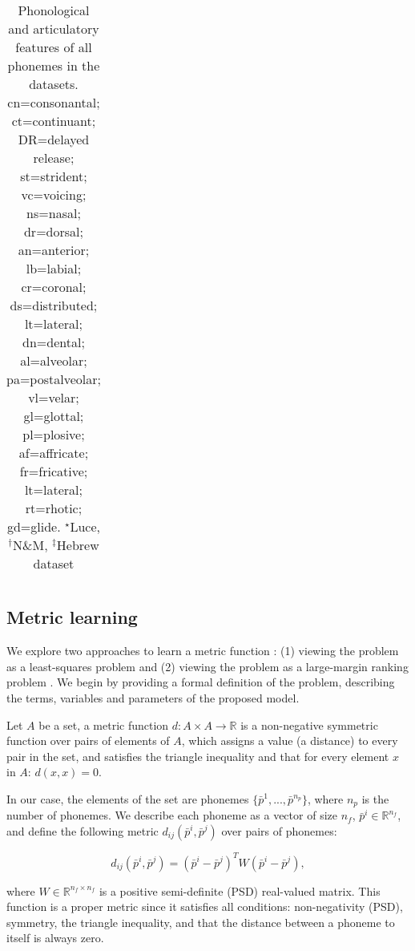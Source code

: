 \begin{landscape}
\begin{table}[H]
\begin{tabular}{|c|c|c|c|c|c|c|c|c|c|c|c|c||c|c|c|c|c|c|c|c|c|c|c|c|c|c|}
\hline

\end{tabular}

\caption{Phonological and articulatory features of all phonemes in the datasets. cn=consonantal; ct=continuant; DR=delayed release; st=strident; vc=voicing; ns=nasal; dr=dorsal; an=anterior; lb=labial; cr=coronal; ds=distributed; lt=lateral; dn=dental; al=alveolar; pa=postalveolar; vl=velar; gl=glottal; pl=plosive; af=affricate; fr=fricative; lt=lateral; rt=rhotic; gd=glide. $^{\star}$Luce, $^{\dagger}$N\&M, $^{\ddagger}$Hebrew dataset}

\end{table}
\end{landscape}

\subsection{Metric learning}
We explore two approaches to learn a metric function \citep{Kulis2012}: (1) viewing the problem as a least-squares problem and (2) viewing the problem as a large-margin ranking problem \citep{Chechik2010}. We begin by providing a formal definition of the problem, describing the terms, variables and parameters of the proposed model.

Let $A$ be a set, a metric function $d: A \times A \to \mathbb{R}$ is a non-negative symmetric function over pairs of elements of $A$, which assigns a value (a distance) to every pair in the set, and satisfies the triangle inequality and that for every element $x$ in $A$: $d(x, x) = 0$.

In our case, the elements of the set are phonemes $\{\bar{p}^1, ..., \bar{p}^{n_p}\}$, where $n_p$ is the number of phonemes. We describe each phoneme as a vector of size $n_f$, $\bar{p}^i \in \mathbb{R} ^{n_f}$, and define the following metric $d_{ij}(\bar{p}^i, \bar{p}^j)$ over pairs of phonemes:

\begin{equation}
    d_{ij}(\bar{p}^i, \bar{p}^j) = (\bar{p}^i - \bar{p}^j)^T W (\bar{p}^i - \bar{p}^j),
\end{equation}

where $W \in \mathbb{R} ^{n_f \times n_f}$ is a positive semi-definite (PSD) real-valued matrix. This function is a proper metric since it satisfies all conditions: non-negativity (PSD), symmetry, the triangle inequality, and that the distance between a phoneme to itself is always zero. 

